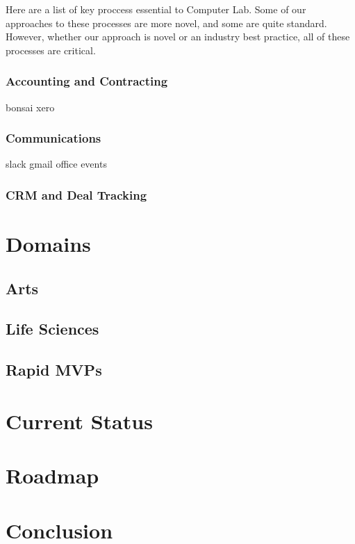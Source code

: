 \documentclass[12pt]{article}
\begin{document}
Here are a list of key proccess essential to Computer Lab. Some of our
approaches to these processes are more novel, and some are quite standard.
However, whether our approach is novel or an industry best practice, all of
these processes are critical.

\subsubsection{Accounting and Contracting}
bonsai
xero

\subsubsection{Communications}
slack gmail office events

\subsubsection{CRM and Deal Tracking}

\section{Domains}
\subsection{Arts}
\subsection{Life Sciences}
\subsection{Rapid MVPs}
\section{Current Status}
\section{Roadmap}
\section{Conclusion}
\end{document}
